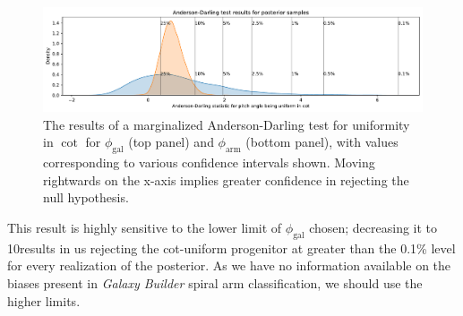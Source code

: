\begin{figure}
  \includegraphics[width=17.7cm]{plots/combined_cot_uniform_marginalized_tests.pdf}
  \caption{The results of a marginalized Anderson-Darling test for uniformity in $\cot$ for $\phi_\mathrm{gal}$ (top panel) and $\phi_\mathrm{arm}$ (bottom panel), with values corresponding to various confidence intervals shown. Moving rightwards on the x-axis implies greater confidence in rejecting the null hypothesis.}
  \label{fig:ad-cot-test}
\end{figure}


This result is highly sensitive to the lower limit of $\phi_\mathrm{gal}$ chosen; decreasing it to 10\degree results in us rejecting the cot-uniform progenitor at greater than the 0.1\% level for every realization of the posterior. As we have no information available on the biases present in \textit{Galaxy Builder} spiral arm classification, we should use the higher limits.

